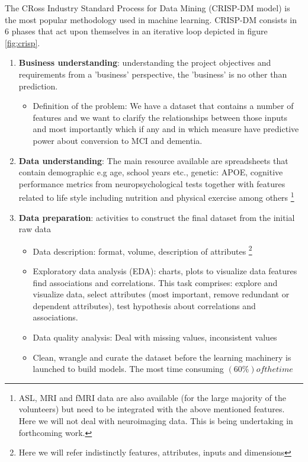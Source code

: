 \documentclass[11pt]{article}
\begin{document}
The CRoss Industry Standard Process for Data Mining (CRISP-DM model) is the most popular methodology used in machine learning. CRISP-DM consists in 6 phases that act upon themselves in an iterative loop depicted in figure \ref{fig:crisp}.
\begin{enumerate}
\item \textbf{Business understanding}: understanding the project objectives and requirements from a 'business' perspective, the 'business' is no other than prediction. 
	\begin{itemize}
		\item Definition of the problem: We have a dataset that contains a number of features and we want to clarify the relationships between those inputs and most importantly which if any and in which measure have predictive power about conversion to MCI and dementia.
	\end{itemize}
\item \textbf{Data understanding}: The main resource available are spreadsheets that contain demographic e.g age, school years etc., genetic: APOE, cognitive performance metrics from neuropsychological tests together with features related to life style including nutrition and physical exercise among others \footnote{ASL, MRI and fMRI data are also available (for the large majority of the volunteers) but need to be integrated with the above mentioned features. Here we will not deal with neuroimaging data. This is being undertaking in forthcoming work.}
\item \textbf{Data preparation}: activities to construct the final dataset from the initial raw data
	\begin{itemize}
		\item Data description: format, volume, description of attributes \footnote{Here we will refer indistinctly features, attributes, inputs and dimensions}
		\item Exploratory data analysis (EDA): charts, plots to visualize data features find associations and correlations. This task comprises: explore and visualize data, select attributes (most important, remove redundant or dependent attributes), test hypothesis about correlations and associations.
		\item Data quality analysis: Deal with missing values, inconsistent values
		\item Clean, wrangle and curate the dataset before the learning machinery is launched to build models. The most time consuming $(60\%) of the time$

\end{itemize}
\end{enumerate}
\end{document}
